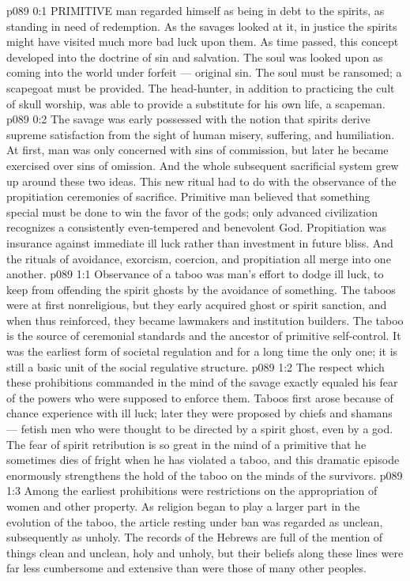 \vs p089 0:1 PRIMITIVE man regarded himself as being in debt to the spirits, as standing in need of redemption. As the savages looked at it, in justice the spirits might have visited much more bad luck upon them. As time passed, this concept developed into the doctrine of sin and salvation. The soul was looked upon as coming into the world under forfeit --- original sin. The soul must be ransomed; a scapegoat must be provided. The head\hyp{}hunter, in addition to practicing the cult of skull worship, was able to provide a substitute for his own life, a scapeman.
\vs p089 0:2 The savage was early possessed with the notion that spirits derive supreme satisfaction from the sight of human misery, suffering, and humiliation. At first, man was only concerned with sins of commission, but later he became exercised over sins of omission. And the whole subsequent sacrificial system grew up around these two ideas. This new ritual had to do with the observance of the propitiation ceremonies of sacrifice. Primitive man believed that something special must be done to win the favor of the gods; only advanced civilization recognizes a consistently even\hyp{}tempered and benevolent God. Propitiation was insurance against immediate ill luck rather than investment in future bliss. And the rituals of avoidance, exorcism, coercion, and propitiation all merge into one another.
\vs p089 1:1 Observance of a taboo was man’s effort to dodge ill luck, to keep from offending the spirit ghosts by the avoidance of something. The taboos were at first nonreligious, but they early acquired ghost or spirit sanction, and when thus reinforced, they became lawmakers and institution builders. The taboo is the source of ceremonial standards and the ancestor of primitive self\hyp{}control. It was the earliest form of societal regulation and for a long time the only one; it is still a basic unit of the social regulative structure.
\vs p089 1:2 The respect which these prohibitions commanded in the mind of the savage exactly equaled his fear of the powers who were supposed to enforce them. Taboos first arose because of chance experience with ill luck; later they were proposed by chiefs and shamans --- fetish men who were thought to be directed by a spirit ghost, even by a god. The fear of spirit retribution is so great in the mind of a primitive that he sometimes dies of fright when he has violated a taboo, and this dramatic episode enormously strengthens the hold of the taboo on the minds of the survivors.
\vs p089 1:3 Among the earliest prohibitions were restrictions on the appropriation of women and other property. As religion began to play a larger part in the evolution of the taboo, the article resting under ban was regarded as unclean, subsequently as unholy. The records of the Hebrews are full of the mention of things clean and unclean, holy and unholy, but their beliefs along these lines were far less cumbersome and extensive than were those of many other peoples.
